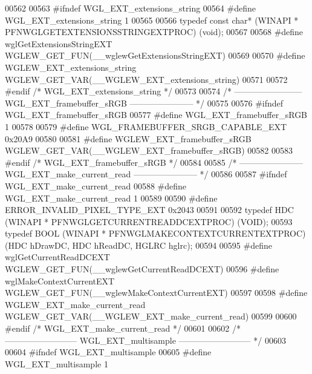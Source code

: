 \begin{DoxyCode}
00562 
00563 \textcolor{preprocessor}{#ifndef WGL\_EXT\_extensions\_string}
00564 \textcolor{preprocessor}{#define WGL\_EXT\_extensions\_string 1}
00565 
00566 \textcolor{keyword}{typedef} \textcolor{keyword}{const} \textcolor{keywordtype}{char}* (WINAPI * PFNWGLGETEXTENSIONSSTRINGEXTPROC) (\textcolor{keywordtype}{void});
00567 
00568 \textcolor{preprocessor}{#define wglGetExtensionsStringEXT WGLEW\_GET\_FUN(\_\_wglewGetExtensionsStringEXT)}
00569 
00570 \textcolor{preprocessor}{#define WGLEW\_EXT\_extensions\_string WGLEW\_GET\_VAR(\_\_WGLEW\_EXT\_extensions\_string)}
00571 
00572 \textcolor{preprocessor}{#endif }\textcolor{comment}{/* WGL\_EXT\_extensions\_string */}\textcolor{preprocessor}{}
00573 
00574 \textcolor{comment}{/* ------------------------ WGL\_EXT\_framebuffer\_sRGB ----------------------- */}
00575 
00576 \textcolor{preprocessor}{#ifndef WGL\_EXT\_framebuffer\_sRGB}
00577 \textcolor{preprocessor}{#define WGL\_EXT\_framebuffer\_sRGB 1}
00578 
00579 \textcolor{preprocessor}{#define WGL\_FRAMEBUFFER\_SRGB\_CAPABLE\_EXT 0x20A9}
00580 
00581 \textcolor{preprocessor}{#define WGLEW\_EXT\_framebuffer\_sRGB WGLEW\_GET\_VAR(\_\_WGLEW\_EXT\_framebuffer\_sRGB)}
00582 
00583 \textcolor{preprocessor}{#endif }\textcolor{comment}{/* WGL\_EXT\_framebuffer\_sRGB */}\textcolor{preprocessor}{}
00584 
00585 \textcolor{comment}{/* ----------------------- WGL\_EXT\_make\_current\_read ----------------------- */}
00586 
00587 \textcolor{preprocessor}{#ifndef WGL\_EXT\_make\_current\_read}
00588 \textcolor{preprocessor}{#define WGL\_EXT\_make\_current\_read 1}
00589 
00590 \textcolor{preprocessor}{#define ERROR\_INVALID\_PIXEL\_TYPE\_EXT 0x2043}
00591 
00592 \textcolor{keyword}{typedef} HDC (WINAPI * PFNWGLGETCURRENTREADDCEXTPROC) (VOID);
00593 \textcolor{keyword}{typedef} BOOL (WINAPI * PFNWGLMAKECONTEXTCURRENTEXTPROC) (HDC hDrawDC, HDC 
      hReadDC, HGLRC hglrc);
00594 
00595 \textcolor{preprocessor}{#define wglGetCurrentReadDCEXT WGLEW\_GET\_FUN(\_\_wglewGetCurrentReadDCEXT)}
00596 \textcolor{preprocessor}{#define wglMakeContextCurrentEXT WGLEW\_GET\_FUN(\_\_wglewMakeContextCurrentEXT)}
00597 
00598 \textcolor{preprocessor}{#define WGLEW\_EXT\_make\_current\_read WGLEW\_GET\_VAR(\_\_WGLEW\_EXT\_make\_current\_read)}
00599 
00600 \textcolor{preprocessor}{#endif }\textcolor{comment}{/* WGL\_EXT\_make\_current\_read */}\textcolor{preprocessor}{}
00601 
00602 \textcolor{comment}{/* -------------------------- WGL\_EXT\_multisample -------------------------- */}
00603 
00604 \textcolor{preprocessor}{#ifndef WGL\_EXT\_multisample}
00605 \textcolor{preprocessor}{#define WGL\_EXT\_multisample 1}

\end{DoxyCode}
